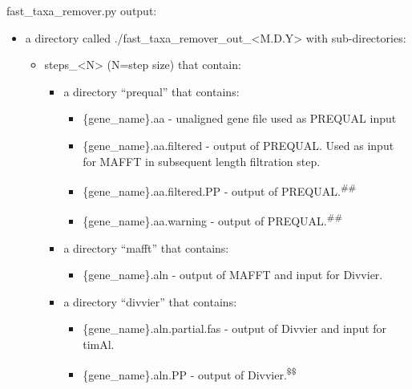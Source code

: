 \documentclass{article}
\begin{document}
\begin{description}
\begin{description}
\begin{description}
                \end{description}
            \end{description}
            \vspace{0.2cm}
            \begin{description}
                \item fast\_taxa\_remover.py output:
                \begin{itemize}
                    \item a directory called ./fast\_taxa\_remover\_out\_<M.D.Y> with sub-directories:
                    \begin{itemize}
                        \item steps\_<N> (N=step size) that contain:
                        \begin{itemize}
                            \item a directory “prequal” that contains:
                            \begin{itemize}
                                \item \{gene\_name\}.aa - unaligned gene file used as PREQUAL input
                                \item \{gene\_name\}.aa.filtered - output of PREQUAL. Used as input for MAFFT in subsequent length filtration step.
                                \item \{gene\_name\}.aa.filtered.PP - output of PREQUAL.\textsuperscript{\#\#}
                                \item \{gene\_name\}.aa.warning - output of PREQUAL.\textsuperscript{\#\#}
                            \end{itemize}
                            \item a directory “mafft” that contains:
                            \begin{itemize}
                                \item \{gene\_name\}.aln - output of MAFFT and input for Divvier.
                            \end{itemize}
                            \item a directory “divvier” that contains:
                            \begin{itemize}
                                \item \{gene\_name\}.aln.partial.fas - output of Divvier and input for timAl.
                                \item \{gene\_name\}.aln.PP - output of Divvier.\textsuperscript{\$\$}

\end{itemize}
\end{itemize}
\end{itemize}
\end{itemize}
\end{description}
\end{description}
\end{document}
